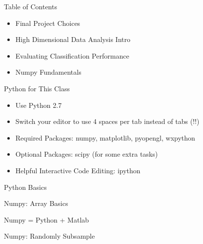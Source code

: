 \documentclass{beamer}
\begin{document}
\begin{frame}{Table of Contents}
\begin{itemize}[label=$\vartriangleright$]
	\item Final Project Choices
\end{itemize}
\begin{itemize}[label=$\vartriangleright$]
	\item High Dimensional Data Analysis Intro
\end{itemize}
\begin{itemize}[label=$\vartriangleright$]
	\item Evaluating Classification Performance
\end{itemize}
\begin{itemize}[label=$\blacktriangleright$]
	\item Numpy Fundamentals
\end{itemize}
\end{frame}

\begin{frame}{Python for This Class}

\begin{itemize}[label=$\vartriangleright$]
\item Use Python 2.7
\item Switch your editor to use 4 spaces per tab instead of tabs (!!)
\item Required Packages: numpy, matplotlib, pyopengl, wxpython
\item Optional Packages: scipy (for some extra tasks)
\item Helpful Interactive Code Editing: ipython
\end{itemize}

\end{frame}

\begin{frame}{Python Basics}



\end{frame}

\begin{frame}{Numpy: Array Basics}

Numpy = Python + Matlab



\end{frame}


\begin{frame}{Numpy: Randomly Subsample}



\end{frame}
\end{document}
